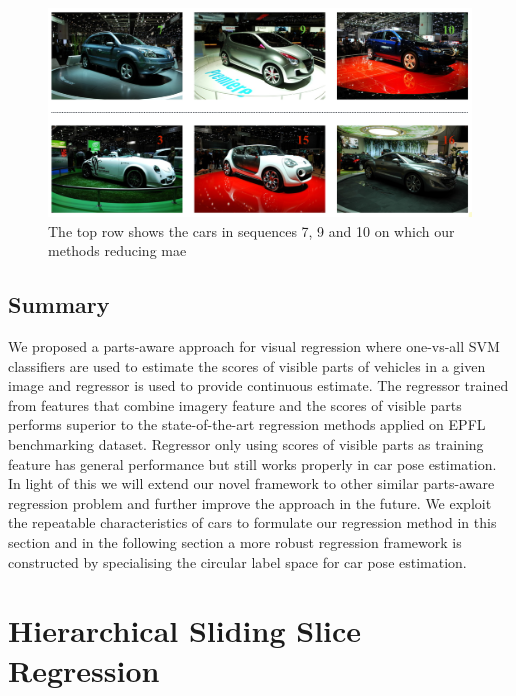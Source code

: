 \documentclass{tutmscthesis}[2010/09/22]
\numberwithin{equation}{section}
\numberwithin{table}{section}
\numberwithin{figure}{section}
\begin{document}
\begin{figure}[h]
\centering
\includegraphics[width=0.98\linewidth]{best-vs-worst.png}
\caption{The top row shows the cars in sequences 7, 9 and 10 on which our methods reducing mae }
\label{fig:ill_example} 
\end{figure}

\subsection{Summary}
We proposed a parts-aware approach for visual regression where one-vs-all SVM classifiers are used to estimate the scores of visible parts of vehicles in a given image and regressor is used to provide continuous estimate. 
The regressor trained from features that combine imagery feature and the scores of visible parts performs superior to the state-of-the-art regression methods applied on EPFL benchmarking dataset. 
Regressor only using scores of visible parts as training feature has general performance but still works properly in car pose estimation. 
In light of this we will extend our novel framework to other similar parts-aware regression problem and further improve the approach in the future. 
We exploit the repeatable characteristics of cars to formulate our regression method in this section and in the following section a more robust regression framework is constructed by specialising the circular label space for car pose estimation.
 

\section{Hierarchical Sliding Slice Regression }\label{sec:HRRS}
\end{document}
